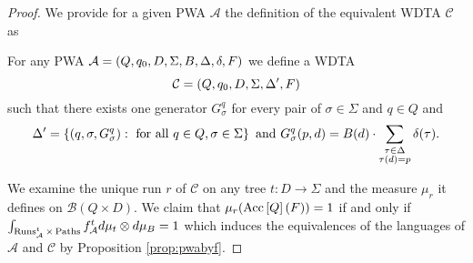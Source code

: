 \begin{proof}
  We provide for a given \ac{PWA} $\mathcal{A}$ the definition of the 
  equivalent \ac{WDTA} $\mathcal{C}$ as
  \begin{definition}
    For any \ac{PWA} 
    $\mathcal{A} = \left(Q, q_{0}, D, \Sigma, B, \Delta, \delta, F\right)$ we define
    a \ac{WDTA}
    \begin{equation*}
      \mathcal{C} = \left(Q, q_{0}, D, \Sigma, \Delta', F\right)
    \end{equation*} 
    such that there exists one generator $G_{\sigma}^{q}$ for every pair of 
    $\sigma\in\Sigma$ and $q\in Q$ and
    \begin{equation*}
      \Delta' = \left\{
        \left(q,\sigma,G_{\sigma}^{q}\right):
          \text{ for all }q\in Q,\sigma\in\Sigma
      \right\}
      \text{ and }
      G_{\sigma}^{q}(p, d) = B(d)\cdot\sum\limits_{
        \substack{\tau\in\Delta\\\tau(d) = p}}\delta(\tau).
    \end{equation*} 
  \end{definition}
  We examine the unique run $r$ of $\mathcal{C}$ on any tree 
  $t:D\rightarrow\Sigma$ and the measure $\mu_{r}$ it defines on 
  $\mathcal{B}(Q\times D)$. We claim that 
  $\mu_{r}(\operatorname{Acc}\left[Q\right](F)) = 1$ if and only if 
  $\int_{\operatorname{Runs}_{\mathcal{A}}^{t}\times\operatorname{Paths}}f_{\mathcal{A}}^{t}d\mu_{t}\otimes
    d\mu_{B} = 1$ which induces the equivalences of the languages of
  $\mathcal{A}$ and $\mathcal{C}$ by Proposition \ref{prop:pwabyf}.


\end{proof}
